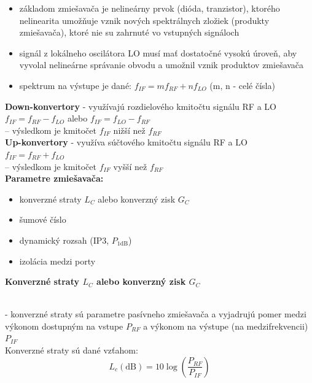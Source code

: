 {{	\begin{itemize}[label=--] 
	\item základom zmiešavača je nelineárny prvok (dióda, tranzistor), ktorého nelinearita umožňuje vznik nových spektrálnych zložiek (produkty zmiešavača), ktoré nie su zahrnuté vo vstupných signáloch
	\item signál z lokálneho oscilátora LO musí mať dostatočné vysokú úroveň, aby vyvolal nelineárne správanie obvodu a umožnil vznik produktov zmiešavača
	\item spektrum na výstupe je dané: $f_{IF} = m f_{RF} + n f_{LO}$ 
	(m, n - celé čísla)
	\end{itemize}
	
	\textbf{Down-konvertory} - využívajú rozdielového kmitočtu signálu RF a LO\\
	$f_{IF} = f_{RF} - f_{LO}$ alebo $f_{IF} = f_{LO} - f_{RF}$\\
	-- výsledkom je kmitočet $f_{IF}$ nižší než $f_{RF}$\\
	\textbf{Up-konvertory} - využíva súčtového kmitočtu signálu RF a LO\\
	$f_{IF} = f_{RF} + f_{LO}$ \\
	-- výsledkom je kmitočet $f_{IF}$ vyšší než $f_{RF}$ \\
	\textbf{Parametre zmiešavača:}
	\begin{itemize}[label=--]
	\item konverzné straty $L_C$ alebo konverzný zisk $G_C$ 
	\item šumové číslo 
	\item dynamický rozsah (IP3, $P_{\text{1dB}}$)
	\item izolácia medzi porty 
	\end{itemize}
	
	{\raggedright \textbf{Konverzné straty $L_C$ alebo konverzný zisk $G_C$}}\\
	- konverzné straty sú parametre pasívneho zmiešavača a vyjadrujú pomer medzi výkonom dostupným na vstupe $P_{RF}$ a výkonom na výstupe (na medzifrekvencii) $P_{IF}$\\
	Konverzné straty sú dané vzťahom:
	\begin{equation}
		L_c (\text{dB}) = 10\log \left(\frac{P_{RF}}{P_{IF}}\right)
	\end{equation}
	
}}
